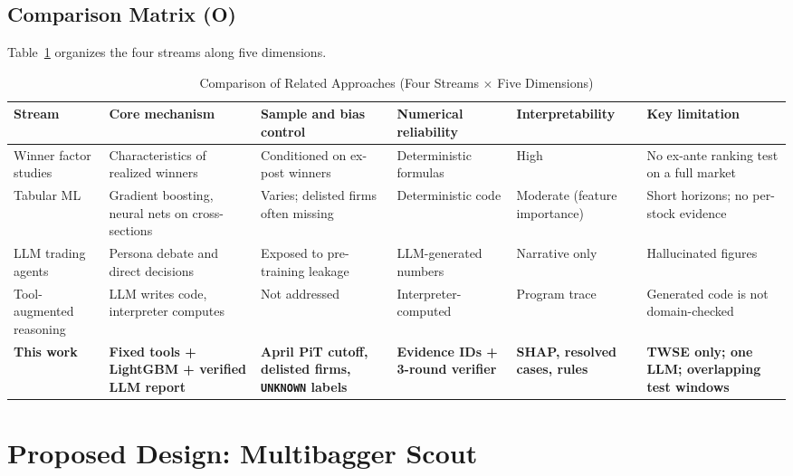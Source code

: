 \documentclass[conference]{IEEEtran}
\begin{document}
\subsection{Comparison Matrix (O)}
Table~\ref{tab:related} organizes the four streams along five dimensions.

\begin{table}[t]
\centering
\caption{Comparison of Related Approaches (Four Streams $\times$ Five Dimensions)}
\label{tab:related}
\begin{tabularx}{\textwidth}{@{}l>{\raggedright}X>{\raggedright}X>{\raggedright}X>{\raggedright}X>{\raggedright\arraybackslash}X@{}}
\toprule
\textbf{Stream} & \textbf{Core mechanism} & \textbf{Sample and bias control} & \textbf{Numerical reliability} & \textbf{Interpretability} & \textbf{Key limitation} \\
\midrule
Winner factor studies~\cite{b2,b10} & Characteristics of realized winners & Conditioned on ex-post winners & Deterministic formulas & High & No ex-ante ranking test on a full market \\
Tabular ML~\cite{b9,b14} & Gradient boosting, neural nets on cross-sections & Varies; delisted firms often missing & Deterministic code & Moderate (feature importance) & Short horizons; no per-stock evidence \\
LLM trading agents~\cite{b13} & Persona debate and direct decisions & Exposed to pre-training leakage~\cite{b6,b7} & LLM-generated numbers & Narrative only & Hallucinated figures~\cite{b8} \\
Tool-augmented reasoning~\cite{b4} & LLM writes code, interpreter computes & Not addressed & Interpreter-computed & Program trace & Generated code is not domain-checked \\
\midrule
\textbf{This work} & \textbf{Fixed tools + LightGBM + verified LLM report} & \textbf{April PiT cutoff, delisted firms, \texttt{UNKNOWN} labels} & \textbf{Evidence IDs + 3-round verifier} & \textbf{SHAP, resolved cases, rules} & \textbf{TWSE only; one LLM; overlapping test windows} \\
\bottomrule
\end{tabularx}
\end{table}

\section{Proposed Design: Multibagger Scout}
\label{sec:method}
\end{document}
